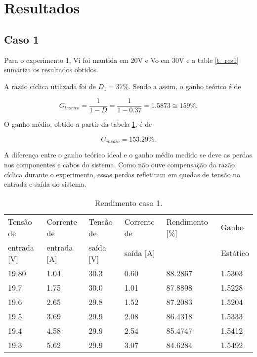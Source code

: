 \newpage
\section{Resultados}

\subsection{Caso 1}

	Para o experimento 1, Vi foi mantida em 20V e Vo em 30V e a table \ref{t_res1} sumariza os resultados obtidos.

	A razão cíclica utilizada foi de $D_1 = 37 \%$. Sendo a assim, o ganho teórico é de

	\[
		G_{teorico} = \frac{1}{1-D} = \frac{1}{1-0.37} = 1.5873 \cong 159 \%.
	\]

	O ganho médio, obtido a partir da tabela \ref{t_rend1}, é de
	
	\[
		G_{medio} = 153.29 \%.
	\]

	A diferença entre o ganho teórico ideal e o ganho médio medido se deve as perdas nos componentes e cabos do sistema. Como não ouve compensação da razão cíclica durante o experimento, essas perdas refletiram em quedas de tensão na entrada e saída do sistema.
	
	\begin{small}
		\begin{table}[H]
			\begin{center}
				\caption{Rendimento caso 1.}
				\begin{tabular}{l|l|l|l|l|l}
					\hline
					Tensão de   &  Corrente de 	& Tensão de & Corrente de	& Rendimento [\%] 	& Ganho    	\\
					entrada [V] &  entrada [A] 	& saída [V] & saída [A]  	&                 	& Estático 	\\
					\hline
					19.80 		& 1.04			& 30.3		& 0.60			& 88.2867			& 1.5303	\\
					\hline
					19.7		& 1.75			& 30.0		& 1.01			& 87.8898			& 1.5228	\\
					\hline
					19.6		& 2.65			& 29.8		& 1.52			& 87.2083			& 1.5204	\\
					\hline
					19.5		& 3.69			& 29.9		& 2.08			& 86.4318			& 1.5333	\\
					\hline
					19.4		& 4.58			& 29.9		& 2.54			& 85.4747			& 1.5412	\\
					\hline
					19.3		& 5.62			& 29.9		& 3.07			& 84.6284			& 1.5492	\\
				\end{tabular}
				\label{t_rend1}
			\end{center}
		\end{table}
	\end{small}

